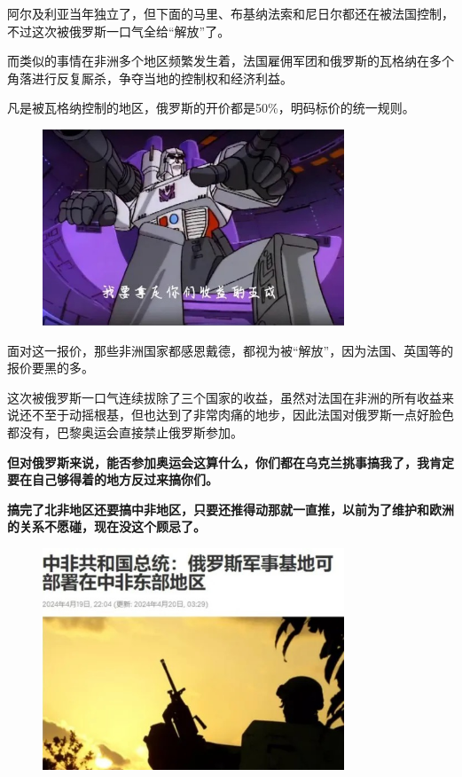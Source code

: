 \documentclass[UTF8, 11pt, oneside]{ctexart}
\newcommand{\zd}[1]{\textbf{\textcolor[RGB]{123,12,0}{#1}}} %
\begin{document}
阿尔及利亚当年独立了，但下面的马里、布基纳法索和尼日尔都还在被法国控制，不过这次被俄罗斯一口气全给“解放”了。

而类似的事情在非洲多个地区频繁发生着，法国雇佣军团和俄罗斯的瓦格纳在多个角落进行反复厮杀，争夺当地的控制权和经济利益。

凡是被瓦格纳控制的地区，俄罗斯的开价都是50\%，明码标价的统一规则。

\begin{figure}[H]
    \centering
    \includegraphics[width=9cm]{2024-08-08-006.jpg}
\end{figure}

面对这一报价，那些非洲国家都感恩戴德，都视为被“解放”，因为法国、英国等的报价要黑的多。

这次被俄罗斯一口气连续拔除了三个国家的收益，虽然对法国在非洲的所有收益来说还不至于动摇根基，但也达到了非常肉痛的地步，因此法国对俄罗斯一点好脸色都没有，巴黎奥运会直接禁止俄罗斯参加。

\zd{但对俄罗斯来说，能否参加奥运会这算什么，你们都在乌克兰挑事搞我了，我肯定要在自己够得着的地方反过来搞你们。}

\zd{搞完了北非地区还要搞中非地区，只要还推得动那就一直推，以前为了维护和欧洲的关系不愿碰，现在没这个顾忌了。}

\begin{figure}[H]
    \centering
    \includegraphics[width=9cm]{2024-08-08-007.jpg}
\end{figure}
\end{document}
